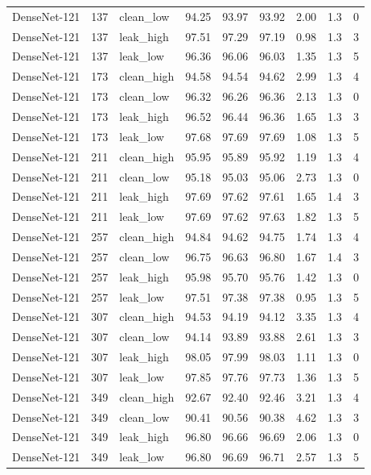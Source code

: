 {\begin{longtable}{lrlrrrrrr}
DenseNet-121 & 137 & clean\_low & 94.25 & 93.97 & 93.92 & 2.00 & 1.3 & 0 \\
DenseNet-121 & 137 & leak\_high & 97.51 & 97.29 & 97.19 & 0.98 & 1.3 & 3 \\
DenseNet-121 & 137 & leak\_low & 96.36 & 96.06 & 96.03 & 1.35 & 1.3 & 5 \\
DenseNet-121 & 173 & clean\_high & 94.58 & 94.54 & 94.62 & 2.99 & 1.3 & 4 \\
DenseNet-121 & 173 & clean\_low & 96.32 & 96.26 & 96.36 & 2.13 & 1.3 & 0 \\
DenseNet-121 & 173 & leak\_high & 96.52 & 96.44 & 96.36 & 1.65 & 1.3 & 3 \\
DenseNet-121 & 173 & leak\_low & 97.68 & 97.69 & 97.69 & 1.08 & 1.3 & 5 \\
DenseNet-121 & 211 & clean\_high & 95.95 & 95.89 & 95.92 & 1.19 & 1.3 & 4 \\
DenseNet-121 & 211 & clean\_low & 95.18 & 95.03 & 95.06 & 2.73 & 1.3 & 0 \\
DenseNet-121 & 211 & leak\_high & 97.69 & 97.62 & 97.61 & 1.65 & 1.4 & 3 \\
DenseNet-121 & 211 & leak\_low & 97.69 & 97.62 & 97.63 & 1.82 & 1.3 & 5 \\
DenseNet-121 & 257 & clean\_high & 94.84 & 94.62 & 94.75 & 1.74 & 1.3 & 4 \\
DenseNet-121 & 257 & clean\_low & 96.75 & 96.63 & 96.80 & 1.67 & 1.4 & 3 \\
DenseNet-121 & 257 & leak\_high & 95.98 & 95.70 & 95.76 & 1.42 & 1.3 & 0 \\
DenseNet-121 & 257 & leak\_low & 97.51 & 97.38 & 97.38 & 0.95 & 1.3 & 5 \\
DenseNet-121 & 307 & clean\_high & 94.53 & 94.19 & 94.12 & 3.35 & 1.3 & 4 \\
DenseNet-121 & 307 & clean\_low & 94.14 & 93.89 & 93.88 & 2.61 & 1.3 & 3 \\
DenseNet-121 & 307 & leak\_high & 98.05 & 97.99 & 98.03 & 1.11 & 1.3 & 0 \\
DenseNet-121 & 307 & leak\_low & 97.85 & 97.76 & 97.73 & 1.36 & 1.3 & 5 \\
DenseNet-121 & 349 & clean\_high & 92.67 & 92.40 & 92.46 & 3.21 & 1.3 & 4 \\
DenseNet-121 & 349 & clean\_low & 90.41 & 90.56 & 90.38 & 4.62 & 1.3 & 3 \\
DenseNet-121 & 349 & leak\_high & 96.80 & 96.66 & 96.69 & 2.06 & 1.3 & 0 \\
DenseNet-121 & 349 & leak\_low & 96.80 & 96.69 & 96.71 & 2.57 & 1.3 & 5 \\

\end{longtable}}
